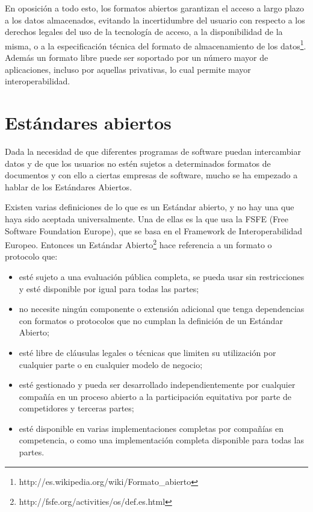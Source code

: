 \documentclass[12pt]{article}
\begin{document}
En oposición a todo esto, los formatos abiertos garantizan el acceso a largo plazo a los datos almacenados, evitando la incertidumbre del usuario con respecto a los derechos legales del uso de la tecnología de acceso, a la disponibilidad de la misma, o a la especificación técnica del formato de almacenamiento de los datos\footnote{http://es.wikipedia.org/wiki/Formato\_abierto}. Además un formato libre puede ser soportado por un número mayor de aplicaciones, incluso por aquellas privativas, lo cual permite mayor interoperabilidad.  

\section*{Estándares abiertos}

Dada la necesidad de que diferentes programas de software puedan intercambiar datos y de que los usuarios no estén sujetos a determinados formatos de documentos y con ello a ciertas empresas de software, mucho se ha empezado a hablar de los Estándares Abiertos. 

Existen varias definiciones de lo que es un Estándar abierto, y no hay una que haya sido aceptada universalmente. Una de ellas es la que usa la FSFE (Free Software Foundation Europe), que se basa en el Framework de Interoperabilidad Europeo. Entonces un Estándar Abierto\footnote{http://fsfe.org/activities/os/def.es.html} hace referencia a un formato o protocolo que: 
\begin{itemize}
\item esté sujeto a una evaluación pública completa, se pueda usar sin restricciones y esté disponible por igual para todas las partes;
\item no necesite ningún componente o extensión adicional que tenga dependencias con formatos o protocolos que no cumplan la definición de un Estándar Abierto;
\item esté libre de cláusulas legales o técnicas que limiten su utilización por cualquier parte o en cualquier modelo de negocio;
\item esté gestionado y pueda ser desarrollado independientemente por cualquier compañía en un proceso abierto a la participación equitativa por parte de competidores y terceras partes;
\item esté disponible en varias implementaciones completas por compañías en competencia, o como una implementación completa disponible para todas las partes.
\end{itemize}
\end{document}
